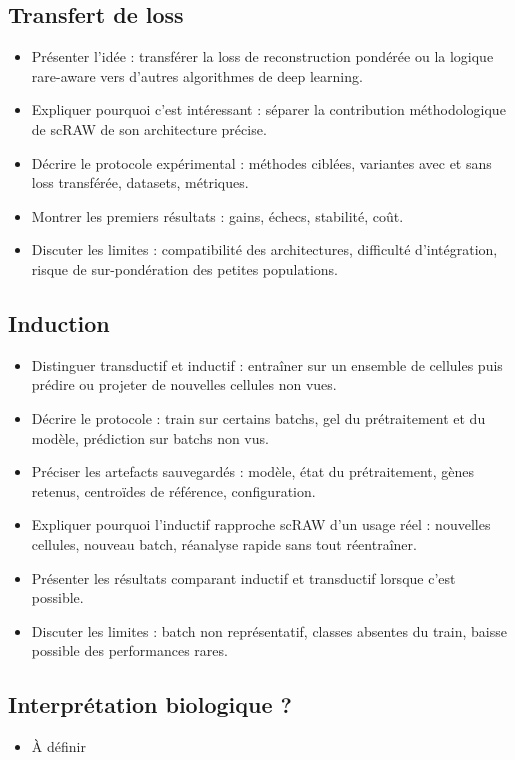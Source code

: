 \setcounter{subsection}{-1}

\subsection{Transfert de loss}
\begin{itemize}
  \item Présenter l'idée : transférer la loss de reconstruction pondérée ou la logique rare-aware vers d'autres algorithmes de deep learning.
  \item Expliquer pourquoi c'est intéressant : séparer la contribution méthodologique de scRAW de son architecture précise.
  \item Décrire le protocole expérimental : méthodes ciblées, variantes avec et sans loss transférée, datasets, métriques.
  \item Montrer les premiers résultats : gains, échecs, stabilité, coût.
  \item Discuter les limites : compatibilité des architectures, difficulté d'intégration, risque de sur-pondération des petites populations.
\end{itemize}

\subsection{Induction}
\begin{itemize}
  \item Distinguer transductif et inductif : entraîner sur un ensemble de cellules puis prédire ou projeter de nouvelles cellules non vues.
  \item Décrire le protocole : train sur certains batchs, gel du prétraitement et du modèle, prédiction sur batchs non vus.
  \item Préciser les artefacts sauvegardés : modèle, état du prétraitement, gènes retenus, centroïdes de référence, configuration.
  \item Expliquer pourquoi l'inductif rapproche scRAW d'un usage réel : nouvelles cellules, nouveau batch, réanalyse rapide sans tout réentraîner.
  \item Présenter les résultats comparant inductif et transductif lorsque c'est possible.
  \item Discuter les limites : batch non représentatif, classes absentes du train, baisse possible des performances rares.
\end{itemize}

\subsection{Interprétation biologique ?}
\begin{itemize}
    \item À définir 
\end{itemize}

